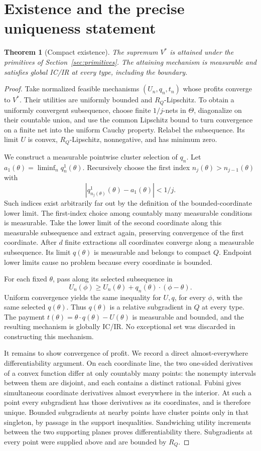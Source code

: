 \documentclass[11pt,a4paper]{article}
\numberwithin{equation}{section}
\newtheorem{theorem}{Theorem}
\begin{document}
\section{Existence and the precise uniqueness statement}\label{sec:existence}
\begin{theorem}[Compact existence]\label{thm:existence}
The supremum \(V^*\) is attained under the primitives of
Section~\ref{sec:primitives}. The attaining mechanism is measurable
and satisfies global IC/IR at every type, including the boundary.
\end{theorem}
\begin{proof}
Take normalized feasible mechanisms \((U_n,q_n,t_n)\) whose profits
converge to \(V^*\). Their utilities are uniformly bounded and
\(R_Q\)-Lipschitz. To obtain a uniformly convergent subsequence, choose
finite \(1/j\)-nets in \(\Theta\), diagonalize on their countable union,
and use the common Lipschitz bound to turn convergence on a finite net
into the uniform Cauchy property. Relabel the subsequence.
Its limit \(U\) is convex, \(R_Q\)-Lipschitz, nonnegative, and has
minimum zero.

We construct a measurable pointwise cluster selection of \(q_n\).
Let \(a_1(\theta)=\liminf_n q_n^1(\theta)\). Recursively choose the first
index \(n_j(\theta)>n_{j-1}(\theta)\) with
\[
 |q_{n_j(\theta)}^1(\theta)-a_1(\theta)|<1/j.
\]
Such indices exist arbitrarily far out by the definition of the
bounded-coordinate lower limit. The first-index choice among countably
many measurable conditions is measurable. Take the lower limit of the
second coordinate along this measurable subsequence and extract again,
preserving convergence of the first coordinate. After \(d\) finite
extractions all coordinates converge along a measurable subsequence.
Its limit \(q(\theta)\) is measurable and belongs to compact \(Q\).
Endpoint lower limits cause no problem because every coordinate is bounded.

For each fixed \(\theta\), pass along its selected subsequence in
\[
 U_n(\phi)\ge U_n(\theta)+q_n(\theta)\cdot(\phi-\theta).
\]
Uniform convergence yields the same inequality for \(U,q\), for every
\(\phi\), with the same selected \(q(\theta)\).
Thus \(q(\theta)\) is a relative subgradient in \(Q\) at every type.
The payment \(t(\theta)=\theta\cdot q(\theta)-U(\theta)\) is measurable
and bounded, and the resulting mechanism is globally IC/IR.
No exceptional set was discarded in constructing this mechanism.

It remains to show convergence of profit. We record a direct
almost-everywhere differentiability argument. On each coordinate line,
the two one-sided derivatives of a convex function differ at only
countably many points: the nonempty intervals between them are disjoint,
and each contains a distinct rational. Fubini gives simultaneous
coordinate derivatives almost everywhere in the interior.
At such a point every subgradient has those derivatives as its
coordinates, and is therefore unique. Bounded subgradients at nearby
points have cluster points only in that singleton, by passage in the
support inequalities. Sandwiching utility increments between the two
supporting planes proves differentiability there.
Subgradients at every point were supplied above and are bounded by \(R_Q\).


\end{proof}
\end{document}
